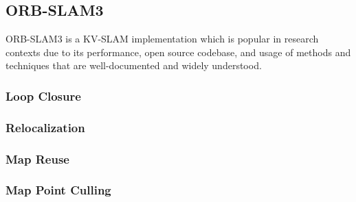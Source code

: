 \subsection{ORB-SLAM3}

ORB-SLAM3 is a KV-SLAM implementation which is popular in research contexts due to its performance, open source codebase, and usage of methods and techniques that are well-documented and widely understood. 

\subsubsection{Loop Closure}
\subsubsection{Relocalization}
\subsubsection{Map Reuse}
\subsubsection{Map Point Culling}